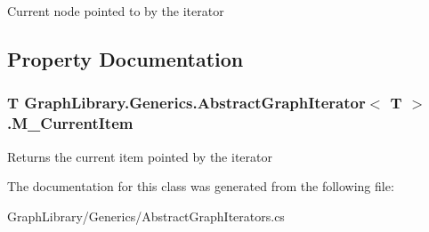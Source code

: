 Current node pointed to by the iterator 



\subsection{Property Documentation}
\hypertarget{class_graph_library_1_1_generics_1_1_abstract_graph_iterator_a6621ff4270d662b95a80c7cbcc75b68c}{}
\subsubsection[{M\+\_\+\+Current\+Item}]{\setlength{\rightskip}{0pt plus 5cm}T {\bf Graph\+Library.\+Generics.\+Abstract\+Graph\+Iterator}$<$ T $>$.M\+\_\+\+Current\+Item\hspace{0.3cm}{\ttfamily [get]}}\label{class_graph_library_1_1_generics_1_1_abstract_graph_iterator_a6621ff4270d662b95a80c7cbcc75b68c}


Returns the current item pointed by the iterator 



The documentation for this class was generated from the following file\+:\begin{DoxyCompactItemize}
\item 
Graph\+Library/\+Generics/Abstract\+Graph\+Iterators.\+cs\end{DoxyCompactItemize}
